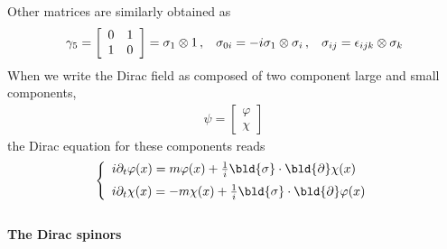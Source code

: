 Other matrices are similarly obtained as
\begin{eqnarray}
\gamma_5
=
\left[
\begin{array}{cc}
0 & 1 \\ 1 & 0
\end{array}
\right]
= \sigma_1 \otimes 1\,,
\hspace{3mm}
\sigma_{0 i} = -i  \sigma_1 \otimes \sigma_i\,,
\hspace{3mm}
\sigma_{i j} = \epsilon_{ijk} \otimes \sigma_k
\end{eqnarray}
When we write the Dirac field as composed of two component 
large and small components,
\begin{eqnarray}
\psi =
\left[
\begin{array}{c}
\varphi \\ \chi
\end{array}
\right]\,
\end{eqnarray}
the Dirac equation for these components reads
\begin{eqnarray}
\left\{
\begin{array}{l}
i \partial_t \varphi(x)
=
m \varphi(x) + \frac{1}{i} \bld{\sigma} \cdot \bld{\partial} \chi(x)
\vspace{2mm}
\\
i \partial_t \chi(x)
=
-m \chi(x) + \frac{1}{i} \bld{\sigma} \cdot \bld{\partial} \varphi(x)
\end{array}
\right.
\end{eqnarray}
\\



\bigskip
\noindent
{\bf The Dirac spinors}

